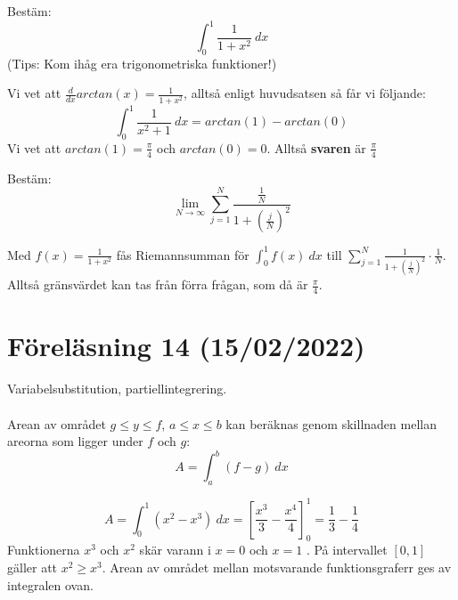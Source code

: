\documentclass{report}
\begin{document}
\vspace{20pt}
\qs{}
{
Bestäm:
\begin{equation*}
	\int_{0}^{1} \frac{1}{1+x^2}  \: dx
\end{equation*}
(Tips: Kom ihåg era trigonometriska funktioner!)
}

\sol Vi vet att $ \frac{d}{dx} arctan(x) = \frac{1}{1+x^2}  $, alltså enligt huvudsatsen så får vi följande:
\begin{equation*}
\int_{0}^{1} \frac{1}{x^2+1}  \: dx = arctan(1) - arctan(0) 
\end{equation*}
Vi vet att $ arctan(1) = \frac{\pi}{4}   $ och $ arctan(0) = 0 $. Alltså \textbf{svaren} är $ \frac{\pi}{4}  $

\vspace{20pt}
\qs{}
{
Bestäm:
\begin{equation*}
\lim_{N \to \infty} \sum_{j = 1}^{N} \frac{ \frac{1}{N} }{1 + ( \frac{j}{N} )^2} 
\end{equation*}
}

\sol Med $ f(x) = \frac{1}{1+x^2}  $ fås Riemannsumman för $ \int_{0}^{1} f(x) \: dx  $ till $ \sum_{j = 1}^{N} \frac{1}{1 + ( \frac{j}{N} )^2} \cdot \frac{1}{N}  $. Alltså gränsvärdet kan tas från förra frågan, som då är $ \frac{\pi}{4}  $.

\pagebreak
\section{Föreläsning 14 (15/02/2022)}
Variabelsubstitution, partiellintegrering.\\\\

\noindent
Arean av området $ g \le y \le f $, $ a \le x \le b $ kan beräknas genom skillnaden mellan areorna som ligger under $ f $ och $ g $:
\begin{equation*}
A = \int_{a}^{b} (f-g) \: dx 
\end{equation*}

{
\begin{equation*}
	A = \int_{0}^{1} (x^2-x^3) \: dx = [ \frac{x^3}{3} - \frac{x^4}{4}  ]_{0}^{1} = \frac{1}{3} - \frac{1}{4} 
\end{equation*}
Funktionerna $ x^3 $ och $ x^2 $ skär varann i $ x= 0 $ och $ x= 1 $ . På intervallet $ [0,1] $ gäller att $ x^2 \ge x^3 $. Arean av området mellan motsvarande funktionsgraferr ges av integralen ovan. 

}
\end{document}
